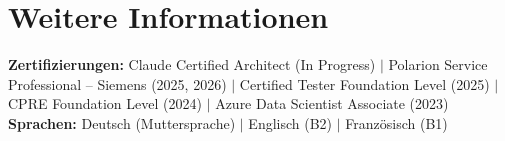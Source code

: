 \documentclass[letterpaper,11pt]{article}
\begin{document}
\section{Weitere Informationen}
 \begin{itemize}[leftmargin=0.15in, label={}]
    \small{\item{
      \textbf{Zertifizierungen:} Claude Certified Architect (In Progress) $|$ Polarion Service Professional -- Siemens (2025, 2026) $|$ Certified Tester Foundation Level (2025) $|$ CPRE Foundation Level (2024) $|$ Azure Data Scientist Associate (2023) \\
      \textbf{Sprachen:} Deutsch (Muttersprache) $|$ Englisch (B2) $|$ Franz\"osisch (B1)
    }}
 \end{itemize}

\end{document}
